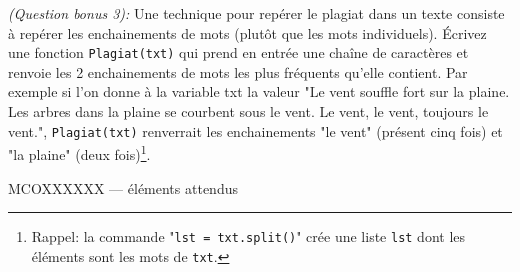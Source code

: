 \documentclass[11pt,a4paper]{exam}
\begin{document}
\begin{questions}
\begin{spacing}{1}
		\vspace{1.5\baselineskip}
		
		\textit{(Question bonus 3): }Une technique pour repérer le plagiat dans un texte consiste à repérer les enchainements de mots (plutôt que les mots individuels). Écrivez une fonction \texttt{Plagiat(txt)} qui prend en entrée une chaîne de caractères et renvoie les 2 enchainements de mots les plus fréquents qu'elle contient. Par exemple si l'on donne à la variable txt la valeur "Le vent souffle fort sur la plaine. Les arbres dans la plaine se courbent sous le vent. Le vent, le vent, toujours le vent.", \texttt{Plagiat(txt)} renverrait les enchainements "le vent" (présent cinq fois) et "la plaine" (deux fois)\footnote{Rappel: la commande "\texttt{lst = txt.split()}" crée une liste \texttt{lst} dont les éléments sont les mots de \texttt{txt}.}.
		\begin{solution}
			MCOXXXXXX --- éléments attendus
		\end{solution} 

        \end{spacing}
    \end{questions}
\end{document}
